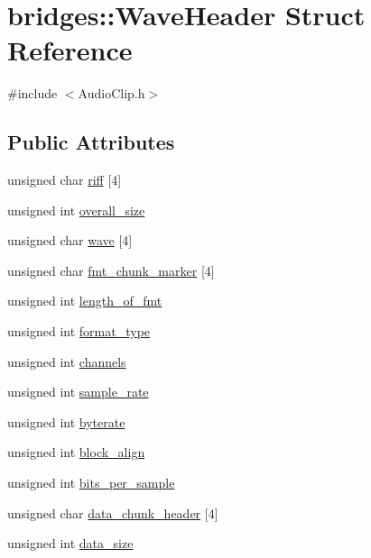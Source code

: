 \hypertarget{structbridges_1_1_wave_header}{}\section{bridges\+:\+:Wave\+Header Struct Reference}
\label{structbridges_1_1_wave_header}


{\ttfamily \#include $<$Audio\+Clip.\+h$>$}

\subsection*{Public Attributes}
\begin{DoxyCompactItemize}
\item 
unsigned char \hyperlink{structbridges_1_1_wave_header_ab4bf9c00a2bfd2ef5eea23c8865b781a}{riff} \mbox{[}4\mbox{]}
\item 
unsigned int \hyperlink{structbridges_1_1_wave_header_a011c1748d68b850b3c46ebaf2f9fafb7}{overall\+\_\+size}
\item 
unsigned char \hyperlink{structbridges_1_1_wave_header_a7f2215f8069f1ea4e5400c8452868fd3}{wave} \mbox{[}4\mbox{]}
\item 
unsigned char \hyperlink{structbridges_1_1_wave_header_a7aa973b40183a9c0e71e916a1e51ccc3}{fmt\+\_\+chunk\+\_\+marker} \mbox{[}4\mbox{]}
\item 
unsigned int \hyperlink{structbridges_1_1_wave_header_a886a118d4fb80b91e397479526683199}{length\+\_\+of\+\_\+fmt}
\item 
unsigned int \hyperlink{structbridges_1_1_wave_header_a3051a4577e1910f458306ff1c6d46d2d}{format\+\_\+type}
\item 
unsigned int \hyperlink{structbridges_1_1_wave_header_aa26100ecfc0b070bb2c333d39c57b50d}{channels}
\item 
unsigned int \hyperlink{structbridges_1_1_wave_header_a5dc65cbc1d601a5e613a4512f8add13f}{sample\+\_\+rate}
\item 
unsigned int \hyperlink{structbridges_1_1_wave_header_a3cba1c387f8133f872bf2529a3f73594}{byterate}
\item 
unsigned int \hyperlink{structbridges_1_1_wave_header_a56bc86e077b8867c0d6e1d669cc3ebcc}{block\+\_\+align}
\item 
unsigned int \hyperlink{structbridges_1_1_wave_header_a84a75f163bd254d4a17bc250a33cc6d7}{bits\+\_\+per\+\_\+sample}
\item 
unsigned char \hyperlink{structbridges_1_1_wave_header_a18e0a7d720f9700a7754111300d33369}{data\+\_\+chunk\+\_\+header} \mbox{[}4\mbox{]}
\item 
unsigned int \hyperlink{structbridges_1_1_wave_header_ab3ec19af6d3e3ef6badb8dbc2f9b4cae}{data\+\_\+size}
\end{DoxyCompactItemize}


